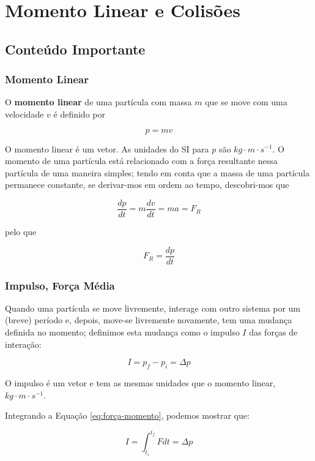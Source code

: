 \section{Momento Linear e Colisões}
\subsection{Conteúdo Importante}
\subsubsection{Momento Linear}

O \textbf{momento linear} de uma partícula com massa $m$ que se move com uma velocidade $v$ é definido por

\begin{equation}\label{eq:momento_linear}
    p=mv
\end{equation}

O momento linear é um vetor. As unidades do SI para $p$ são $kg\cdot m \cdot s^{-1}$.
O momento de uma partícula está relacionado com a força resultante nessa partícula de uma maneira simples; tendo em conta que a massa de uma partícula permanece constante, se derivar-mos em ordem ao tempo, descobri-mos que

$$
\frac{dp}{dt}=m\frac{dv}{dt}=ma=F_{R}
$$

pelo que

\begin{equation}\label{eq:força-momento}
    F_{R}=\frac{dp}{dt}
\end{equation}

\subsubsection{Impulso, Força Média}
Quando uma partícula se move livremente, interage com outro sistema por um (breve) período e, depois, move-se livremente novamente, tem uma mudança definida no momento; definimos esta mudança como o impulso $I$ das forças de interação:

\begin{equation}\label{eq:impulso}
    I=p_f-p_i=\Delta p
\end{equation}

O impulso é um vetor e tem as mesmas unidades que o momento linear, $kg\cdot m \cdot s^{-1}$.

Integrando a Equação \ref{eq:força-momento}, podemos mostrar que:

$$
I=\int_{t_i}^{t_f}Fdt=\Delta p
$$

